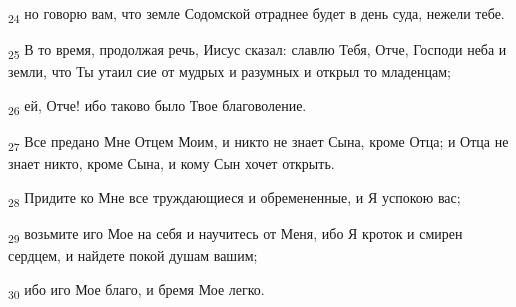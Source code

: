\begin{tcolorbox}
\textsubscript{24} но говорю вам, что земле Содомской отраднее будет в день суда, нежели тебе.
\end{tcolorbox}
\begin{tcolorbox}
\textsubscript{25} В то время, продолжая речь, Иисус сказал: славлю Тебя, Отче, Господи неба и земли, что Ты утаил сие от мудрых и разумных и открыл то младенцам;
\end{tcolorbox}
\begin{tcolorbox}
\textsubscript{26} ей, Отче! ибо таково было Твое благоволение.
\end{tcolorbox}
\begin{tcolorbox}
\textsubscript{27} Все предано Мне Отцем Моим, и никто не знает Сына, кроме Отца; и Отца не знает никто, кроме Сына, и кому Сын хочет открыть.
\end{tcolorbox}
\begin{tcolorbox}
\textsubscript{28} Придите ко Мне все труждающиеся и обремененные, и Я успокою вас;
\end{tcolorbox}
\begin{tcolorbox}
\textsubscript{29} возьмите иго Мое на себя и научитесь от Меня, ибо Я кроток и смирен сердцем, и найдете покой душам вашим;
\end{tcolorbox}
\begin{tcolorbox}
\textsubscript{30} ибо иго Мое благо, и бремя Мое легко.
\end{tcolorbox}
